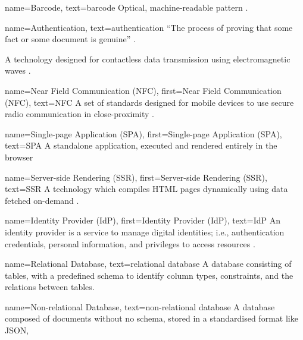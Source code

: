 {
  name={Barcode},
  text={barcode}
}
{
  Optical, machine-readable pattern
  \parencite{whatIsABarcode}.
}

{
  name={Authentication},
  text=authentication
}
{
  \enquote{The process of proving that some fact or some
    document is genuine} \parencite{whatIsAuth}.
}

{
  A technology designed for contactless data transmission
  using electromagnetic waves \parencite{whatIsRfid}.
}

{
  name={Near Field Communication (NFC)},
  first={Near Field Communication (NFC)},
  text={NFC}
}
{
  A set of standards designed for mobile devices to use
  secure radio communication in close-proximity \cite{nfc}.
}

{
  name={Single-page Application (SPA)},
  first={Single-page Application (SPA)},
  text={SPA}
}
{
  A standalone application, executed and rendered entirely
  in the browser \parencite{webTechComparison}
}

{
  name={Server-side Rendering (SSR)},
  first={Server-side Rendering (SSR)},
  text={SSR}
}
{
  A technology which compiles HTML pages dynamically using 
  data fetched on-demand \parencite{webTechComparison}.
}

{
  name={Identity Provider (IdP)},
  first={Identity Provider (IdP)},
  text={IdP}
}
{
  An identity provider is a service to manage digital
  identities; i.e., authentication credentials, personal
  information, and privileges to access resources 
  \parencite{identityProviders}.
}

{
  name={Relational Database},
  text={relational database}
}
{
  A database consisting of tables, with a predefined schema
  to identify column types, constraints, and the relations
  between tables. 
}

{
  name={Non-relational Database},
  text={non-relational database}
}
{
  A database composed of documents without no schema, 
  stored in a standardised format like JSON, 
}